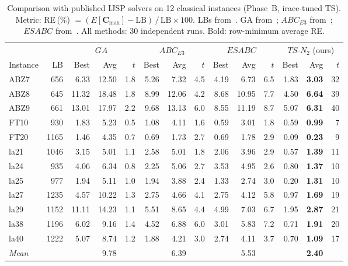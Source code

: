 \begin{table}[t]
\centering\small\setlength{\tabcolsep}{3.5pt}
\caption{Comparison with published IJSP solvers on 12 classical instances (Phase~B, irace-tuned TS). Metric: RE\,(\%) $= (E[\mathbf{C}_{\max}] - \text{LB})\,/\,\text{LB} \times 100$. LBs from~\cite{DiazFEABC2023}. GA from~\cite{DiazIPMU2020}; $ABC_{E3}$ from~\cite{DiazFEABC2023}; $ESABC$ from~\cite{DiazICAE2023}. All methods: 30 independent runs. Bold: row-minimum average RE.}
\label{tab:lit_classical}
\begin{tabular}{l r | rr r | rr r | rr r | rr r}
\hline
 & & \multicolumn{3}{c|}{$GA$~\cite{DiazIPMU2020}} & \multicolumn{3}{c|}{$ABC_{E3}$~\cite{DiazFEABC2023}} & \multicolumn{3}{c|}{$ESABC$~\cite{DiazICAE2023}} & \multicolumn{3}{c}{$TS$-$N_2$ (ours)} \\
Instance & LB & Best & Avg & $t$ & Best & Avg & $t$ & Best & Avg & $t$ & Best & Avg & $t$ \\
\hline
ABZ7 & 656 & 6.33 & 12.50 & 1.8 & 5.26 & 7.32 & 4.5 & 4.19 & 6.73 & 6.5 & 1.83 & \textbf{3.03} & 32 \\
ABZ8 & 645 & 11.32 & 18.48 & 1.8 & 8.99 & 12.06 & 4.2 & 8.68 & 10.95 & 7.7 & 4.50 & \textbf{6.64} & 39 \\
ABZ9 & 661 & 13.01 & 17.97 & 2.2 & 9.68 & 13.13 & 6.0 & 8.55 & 11.19 & 8.7 & 5.07 & \textbf{6.31} & 40 \\
FT10 & 930 & 1.83 & 5.23 & 0.5 & 1.08 & 4.11 & 1.6 & 0.59 & 3.01 & 1.8 & 0.59 & \textbf{0.99} & 7 \\
FT20 & 1165 & 1.46 & 4.35 & 0.7 & 0.69 & 1.73 & 2.7 & 0.69 & 1.78 & 2.9 & 0.09 & \textbf{0.23} & 9 \\
la21 & 1046 & 3.15 & 5.01 & 1.1 & 2.58 & 5.01 & 1.8 & 2.06 & 3.96 & 2.9 & 0.57 & \textbf{1.39} & 11 \\
la24 & 935 & 4.06 & 6.34 & 0.8 & 2.25 & 5.06 & 2.7 & 3.53 & 4.95 & 2.6 & 0.80 & \textbf{1.37} & 10 \\
la25 & 977 & 1.94 & 5.11 & 1.0 & 1.94 & 3.88 & 2.4 & 1.33 & 2.74 & 3.0 & 0.20 & \textbf{1.31} & 10 \\
la27 & 1235 & 4.57 & 10.22 & 1.3 & 2.75 & 4.66 & 4.1 & 2.75 & 4.12 & 5.8 & 0.97 & \textbf{1.69} & 19 \\
la29 & 1152 & 11.11 & 14.23 & 1.1 & 5.51 & 8.65 & 4.4 & 4.99 & 7.03 & 6.7 & 1.95 & \textbf{2.87} & 21 \\
la38 & 1196 & 6.02 & 9.16 & 1.4 & 4.52 & 6.88 & 6.0 & 3.01 & 5.83 & 7.2 & 0.71 & \textbf{1.91} & 20 \\
la40 & 1222 & 5.07 & 8.74 & 1.2 & 1.88 & 4.21 & 3.0 & 2.74 & 4.11 & 3.7 & 0.70 & \textbf{1.09} & 17 \\
\hline
\textit{Mean} & & & 9.78 & & & 6.39 & & & 5.53 & & & \textbf{2.40} & \\
\hline
\end{tabular}
\end{table}
